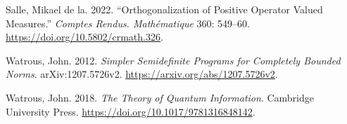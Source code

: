 \documentclass[
  11pt,
  a4paper,
]{article}
\newlength{\cslhangindent}
\newenvironment{CSLReferences}[2] %
 {\begin{list}{}{%
  \setlength{\itemindent}{0pt}
  \setlength{\leftmargin}{0pt}
  \setlength{\parsep}{0pt}
  \ifodd #1
   \setlength{\leftmargin}{\cslhangindent}
   \setlength{\itemindent}{-1\cslhangindent}
  \fi
  \setlength{\itemsep}{#2\baselineskip}}}
 {\end{list}}
\begin{document}
\begin{CSLReferences}{1}{1}
Salle, Mikael de la. 2022. {``Orthogonalization of Positive Operator
Valued Measures.''} \emph{Comptes Rendus. Mathématique} 360: 549--60.
\url{https://doi.org/10.5802/crmath.326}.

Watrous, John. 2012. \emph{Simpler Semidefinite Programs for Completely
Bounded Norms}. arXiv:1207.5726v2.
\url{https://arxiv.org/abs/1207.5726v2}.

Watrous, John. 2018. \emph{The Theory of Quantum Information}. Cambridge
University Press. \url{https://doi.org/10.1017/9781316848142}.

\end{CSLReferences}
\end{document}
